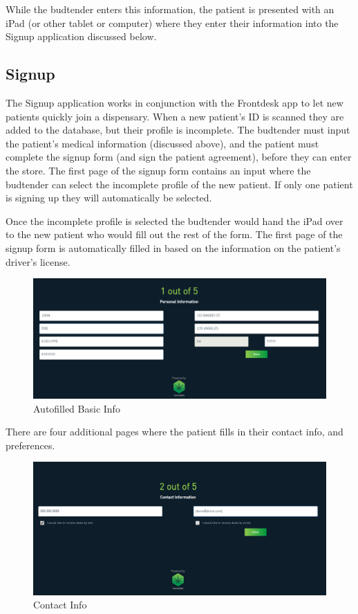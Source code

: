 \documentclass[]{book}
\theoremstyle{definition}
\theoremstyle{definition}
\theoremstyle{definition}
\theoremstyle{remark}
\begin{document}
While the budtender enters this information, the patient is presented
with an iPad (or other tablet or computer) where they enter their
information into the Signup application discussed below.

\subsection{Signup}\label{signup}

The Signup application works in conjunction with the Frontdesk app to
let new patients quickly join a dispensary. When a new patient's ID is
scanned they are added to the database, but their profile is incomplete.
The budtender must input the patient's medical information (discussed
above), and the patient must complete the signup form (and sign the
patient agreement), before they can enter the store. The first page of
the signup form contains an input where the budtender can select the
incomplete profile of the new patient. If only one patient is signing up
they will automatically be selected.

Once the incomplete profile is selected the budtender would hand the
iPad over to the new patient who would fill out the rest of the form.
The first page of the signup form is automatically filled in based on
the information on the patient's driver's license.

\begin{figure}
\centering
\includegraphics{images/S1.png}
\caption{Autofilled Basic Info}
\end{figure}

There are four additional pages where the patient fills in their contact
info, and preferences.

\begin{figure}
\centering
\includegraphics{images/S4.png}
\caption{Contact Info}
\end{figure}
\end{document}
